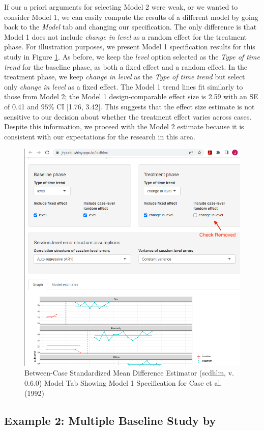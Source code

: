 \documentclass[
]{book}
\begin{document}
If our a priori arguments for selecting Model 2 were weak, or we wanted to consider Model 1, we can easily compute the results of a different model by going back to the \emph{Model} tab and changing our specification. The only difference is that Model 1 does not include \emph{change in level} as a random effect for the treatment phase. For illustration purposes, we present Model 1 specification results for this study in Figure \ref{fig:Model1-Case-1992}. As before, we keep the \emph{level} option selected as the \emph{Type of time trend} for the baseline phase, as both a fixed effect and a random effect. In the treatment phase, we keep \emph{change in level} as the \emph{Type of time trend} but select only \emph{change in level} as a fixed effect. The Model 1 trend lines fit similarly to those from Model 2; the Model 1 design-comparable effect size is 2.59 with an SE of 0.41 and \(95\%\) CI {[}1.76, 3.42{]}. This suggests that the effect size estimate is not sensitive to our decision about whether the treatment effect varies across cases. Despite this information, we proceed with the Model 2 estimate because it is consistent with our expectations for the research in this area.

\begin{figure}
\includegraphics[width=0.5\linewidth,height=0.75\textheight]{images/app.model.model1_Case1992} \caption{Between-Case Standardized Mean Difference Estimator (scdhlm, v. 0.6.0) Model Tab Showing Model 1 Specification for Case et al. (1992)}\label{fig:Model1-Case-1992}
\end{figure}

\hypertarget{example-2-multiple-baseline-study-by-peltier2020effects}{%
\subsection{\texorpdfstring{Example 2: Multiple Baseline Study by \citet{peltier2020Effects}}{Example 2: Multiple Baseline Study by @peltier2020Effects}}\label{example-2-multiple-baseline-study-by-peltier2020effects}}
\end{document}
